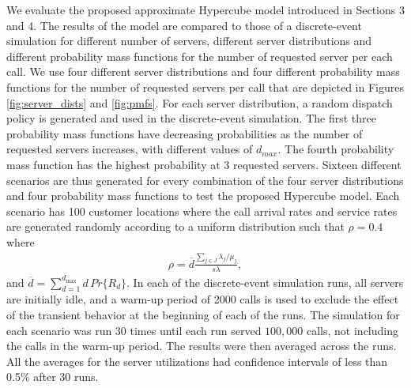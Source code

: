 \documentclass[11pt]{article}\topmargin 0mm
\begin{document}
We evaluate the proposed approximate Hypercube model introduced
in Sections 3 and 4. The results of the model are compared to
those of a discrete-event simulation for different number of
servers, different server distributions and different
probability mass functions for the number of requested server
per each call. We use four different server distributions and
four different probability mass functions for the number of requested servers per call that are depicted in
Figures \ref{fig:server_dists} and \ref{fig:pmfs}. For each
server distribution, a random dispatch policy is generated and
used in the discrete-event simulation.
The first three probability mass functions have decreasing
probabilities as the number of requested servers increases,
with different values of $d_{max}$. The fourth probability mass
function has the highest probability at 3 requested servers.
Sixteen different scenarios are thus generated for every
combination of the four server distributions and four
probability mass functions to test the proposed Hypercube
model. Each scenario has 100 customer locations where the call
arrival rates and service rates are generated randomly
according to a uniform distribution such that $\rho=0.4$ where
\begin{equation}
\label{eq:rho}
\begin{split}
\rho = \overline{d}\frac{\sum_{j\in J} \lambda_j / \mu_j}{s \lambda},
\end{split}
\end{equation}
and $\overline{d} = \sum_{d=1}^{d_{\max}} d\, Pr\{R_d\}$.
{\color{blue}In each of the discrete-event simulation runs, all servers are initially idle, and a warm-up period of 2000 calls is used to exclude the effect of the transient behavior at the beginning of each of the runs. The simulation for each scenario was run 30 times until each run served $100,000$ calls, not including the calls in the warm-up period. The results were then averaged across the runs. All the averages for the server utilizations had confidence intervals of less than 0.5\% after 30 runs.}
\end{document}

